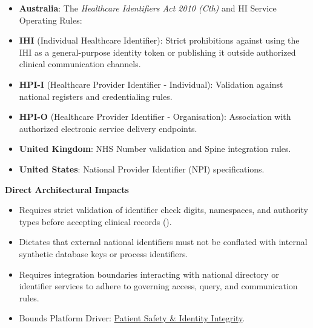 \begin{itemize}


\item \textbf{Australia}: The \emph{Healthcare Identifiers Act 2010 (Cth)} and HI Service Operating Rules:

\item \textbf{IHI} (Individual Healthcare Identifier): Strict prohibitions against using the IHI as a general-purpose identity token or publishing it outside authorized clinical communication channels.

\item \textbf{HPI-I} (Healthcare Provider Identifier - Individual): Validation against national registers and credentialing rules.

\item \textbf{HPI-O} (Healthcare Provider Identifier - Organisation): Association with authorized electronic service delivery endpoints.

\item \textbf{United Kingdom}: NHS Number validation and Spine integration rules.

\item \textbf{United States}: National Provider Identifier (NPI) specifications.

\end{itemize}


\par\medskip\textbf{Direct Architectural Impacts}\par


\begin{itemize}


\item Requires strict validation of identifier check digits, namespaces, and authority types before accepting clinical records (\href{\detokenize{../../../../../../../../docs/markdown/01-motivation/requirements-constraints/foundational-requirements.md}}{\texttt{}}).

\item Dictates that external national identifiers must not be conflated with internal synthetic database keys or process identifiers.

\item Requires integration boundaries interacting with national directory or identifier services to adhere to governing access, query, and communication rules.

\item Bounds Platform Driver: \href{\detokenize{../../../../../../../../docs/markdown/01-motivation/drivers-assessments/drivers.md}}{Patient Safety \& Identity Integrity}.

\end{itemize}

